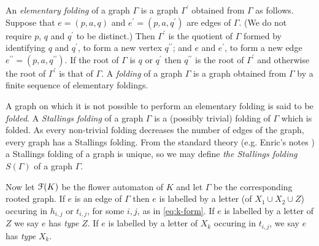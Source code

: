 \documentclass[a4paper,12pt]{article}
\newcommand{\G}{\Gamma }
\newcommand{\cF}{{\cal{F}}}
\newtheorem{exam}[theorem]{Example}
\newenvironment{example}{\begin{exam} \rm}{\end{exam}}
\numberwithin{equation}{section}
\numberwithin{figure}{section}
\begin{document}

An {\em elementary folding} of a graph $\G$ is a graph $\G^\prime$
obtained from $\G$ as follows. Suppose that $e=(p,a,q)$ and
$e^\prime=(p,a,q^\prime)$
are edges of $\G$. (We do not require $p$, $q$ and $q^\prime$ to be distinct.)
 Then $\G^\prime$ is the quotient of $\G$ formed by identifying
$q$ and $q^\prime$, to form a new vertex $q^{\prime\prime}$; and
$e$ and $e^\prime$, to form a new edge
$e^{\prime\prime}=(p,a,q^{\prime\prime})$. If the root of $\G$ is $q$
 or $q^\prime$ then $q^{\prime\prime}$ is the root of $\G^\prime$ and otherwise
 the root of $\G^\prime$ is that of $\G$.
 A {\em folding} of a graph $\G$ is a graph obtained
from $\G$ by a finite sequence of elementary foldings.

A graph on which  it is not possible to perform an elementary
folding is
said to be {\em folded}. A {\em Stallings folding} of a graph $\G$ is
 a (possibly trivial) folding of $\G$ which is folded. As every non-trivial
folding decreases
 the number of edges of the graph, every graph has a Stallings folding.
From the
standard theory (e.g. Enric's notes \cite{ventura11}) a Stallings folding of a graph is unique,
so we may define {\em the Stallings folding} $S(\G)$ of a graph $\G$.

%
%


Now let $\cF(K)$ be the flower automaton of $K$ and let
$\G$ be the corresponding rooted graph. If $e$ is an edge of $\G$ then
$e$ is labelled by a letter (of $X_1\cup X_2 \cup Z$)
occuring in $h_{i,j}$ or $t_{i,j}$, for some $i,j$, as in
\eqref{eq:k-form}. If $e$ is labelled by a letter of $Z$ we say $e$ has {\em type} $Z$.
If $e$ is labelled by a letter of $X_k$ occuring in
$t_{i,j}$, we say $e$ has {\em type} $X_k$.

\end{document}
